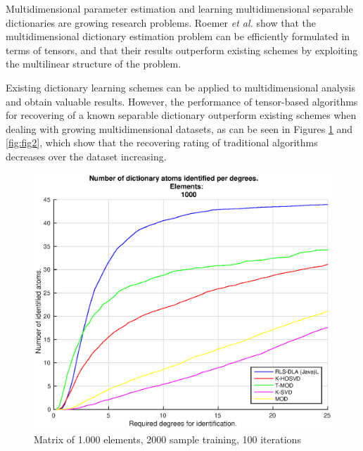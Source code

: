 
Multidimensional parameter estimation and learning multidimensional separable dictionaries are growing research problems. Roemer \emph{et al.} \cite{roemer2014tensor} show that the multidimensional dictionary estimation problem can be efficiently formulated in terms of tensors, and that their results outperform existing schemes by exploiting the multilinear structure of the problem.

Existing dictionary learning schemes can be applied to multidimensional analysis and obtain valuable results. However, the performance of tensor-based algorithms for recovering of a known separable dictionary outperform existing schemes when dealing with growing multidimensional datasets, as can be seen in Figures \ref{fig:fig1} and \ref{fig:fig2}, which show that the recovering rating of traditional algorithms decreases over the dataset increasing.

\begin{figure}[!htb]
     \centering 
	 \includegraphics[width=12cm]{figures/5_20_2000_1000_100.eps}
     \caption{Matrix of 1.000 elements, 2000 sample training, 100 iterations}
     \label{fig:fig1}
\end{figure}

